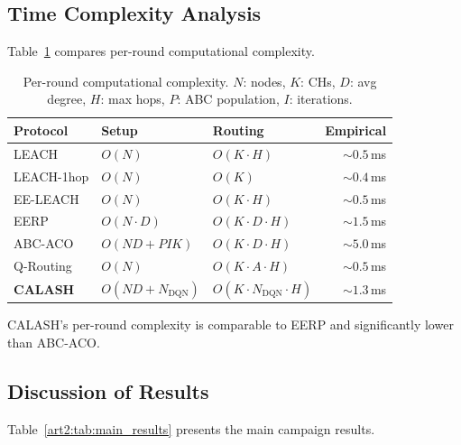 \subsection{Time Complexity Analysis}
\label{art2:sec:complexity}

Table~\ref{art2:tab:complexity} compares per-round computational complexity.

\begin{table}[!t]
\centering
\caption{Per-round computational complexity. $N$: nodes, $K$: CHs, $D$: avg degree, $H$: max hops, $P$: ABC population, $I$: iterations.}
\label{art2:tab:complexity}
\begin{tabular}{lllr}
\toprule
Protocol & Setup & Routing & Empirical \\
\midrule
LEACH~\cite{heinzelman2000leach}       & $O(N)$             & $O(K \cdot H)$       & ${\sim}0.5$\,ms \\
LEACH-1hop                              & $O(N)$             & $O(K)$               & ${\sim}0.4$\,ms \\
EE-LEACH~\cite{bakaraniya2013eeleach}  & $O(N)$             & $O(K \cdot H)$       & ${\sim}0.5$\,ms \\
EERP~\cite{biswas2018eerp}             & $O(N \cdot D)$     & $O(K \cdot D \cdot H)$ & ${\sim}1.5$\,ms \\
ABC-ACO~\cite{elkhediri2024abcaco}     & $O(N\!D + PIK)$   & $O(K \cdot D \cdot H)$ & ${\sim}5.0$\,ms \\
Q-Routing~\cite{boyan1994qrouting}   & $O(N)$             & $O(K \cdot A \cdot H)$ & ${\sim}0.5$\,ms \\
\textbf{CALASH}                         & $O(N\!D + N_{\text{DQN}})$ & $O(K \cdot N_{\text{DQN}} \cdot H)$ & ${\sim}1.3$\,ms \\
\bottomrule
\end{tabular}
\end{table}

CALASH's per-round complexity is comparable to EERP and significantly lower than ABC-ACO.

\subsection{Discussion of Results}
\label{art2:sec:discussion}

Table~\ref{art2:tab:main_results} presents the main campaign results.

